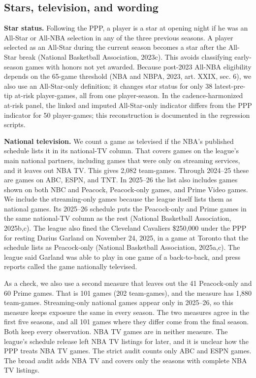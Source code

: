 \documentclass[11pt]{article}
\begin{document}
\FloatBarrier
\subsection{Stars, television, and wording}

\noindent\textbf{Star status.} Following the PPP, a player is a star at opening night if he was an All-Star or All-NBA selection in any of the three previous seasons. A player selected as an All-Star during the current season becomes a star after the All-Star break (National Basketball Association, 2023c). This avoids classifying early-season games with honors not yet awarded. Because post-2023 All-NBA eligibility depends on the 65-game threshold (NBA and NBPA, 2023, art. XXIX, sec. 6), we also use an All-Star-only definition; it changes star status for only 38 latest-pre-tip at-risk player-games, all from one player-season. In the cadence-harmonized at-risk panel, the linked and imputed All-Star-only indicator differs from the PPP indicator for 50 player-games; this reconstruction is documented in the regression scripts.

\noindent\textbf{National television.} We count a game as televised if the NBA's published schedule lists it in its national-TV column. That covers games on the league's main national partners, including games that were only on streaming services, and it leaves out NBA TV. This gives 2,082 team-games. Through 2024--25 these are games on ABC, ESPN, and TNT. In 2025--26 the list also includes games shown on both NBC and Peacock, Peacock-only games, and Prime Video games. We include the streaming-only games because the league itself lists them as national games. Its 2025--26 schedule puts the Peacock-only and Prime games in the same national-TV column as the rest (National Basketball Association, 2025b,c). The league also fined the Cleveland Cavaliers \$250,000 under the PPP for resting Darius Garland on November 24, 2025, in a game at Toronto that the schedule lists as Peacock-only (National Basketball Association, 2025a,c). The league said Garland was able to play in one game of a back-to-back, and press reports called the game nationally televised.

As a check, we also use a second measure that leaves out the 41 Peacock-only and 60 Prime games. That is 101 games (202 team-games), and the measure has 1,880 team-games. Streaming-only national games appear only in 2025--26, so this measure keeps exposure the same in every season. The two measures agree in the first five seasons, and all 101 games where they differ come from the final season. Both keep every observation. NBA TV games are in neither measure. The league's schedule release left NBA TV listings for later, and it is unclear how the PPP treats NBA TV games. The strict audit counts only ABC and ESPN games. The broad audit adds NBA TV and covers only the seasons with complete NBA TV listings.
\end{document}
